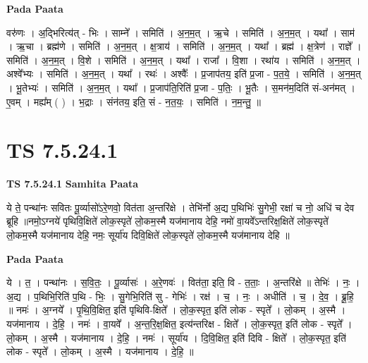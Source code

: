 \documentclass[17pt]{extarticle}
\begin{document}
\textbf{Pada Paata} \newline

वरु॑णः । अ॒द्भिरित्य॑त् - भिः । साम्ने᳚ । समिति॑ । अ॒न॒म॒त् । ऋ॒चे । समिति॑ । अ॒न॒म॒त् । यथा᳚ । साम॑ । ऋ॒चा । ब्रह्म॑णे । समिति॑ । अ॒न॒म॒त् । क्ष॒त्राय॑ । समिति॑ । अ॒न॒म॒त् । यथा᳚ । ब्रह्म॑ । क्ष॒त्रेण॑ । राज्ञे᳚ । समिति॑ । अ॒न॒म॒त् । वि॒शे । समिति॑ । अ॒न॒म॒त् । यथा᳚ । राजा᳚ । वि॒शा । रथा॑य । समिति॑ । अ॒न॒म॒त् । अश्वे᳚भ्यः । समिति॑ । अ॒न॒म॒त् । यथा᳚ । रथः॑ । अश्वैः᳚ । प्र॒जाप॑तय॒ इति॑ प्र॒जा - प॒त॒ये॒ । समिति॑ । अ॒न॒म॒त् । भू॒तेभ्यः॑ । समिति॑ । अ॒न॒म॒त् । यथा᳚ । प्र॒जाप॑ति॒रिति॑ प्र॒जा - प॒तिः॒ । भू॒तैः । स॒मन॑म॒दिति॑ सं-अन॑मत् । ए॒वम् । मह्य᳚म् ( ) । भ॒द्राः । संन॑तय॒ इति॒ सं - न॒त॒यः॒ । समिति॑ । न॒म॒न्तु॒ ॥  \newline




\section*{ TS 7.5.24.1 }

\textbf{TS 7.5.24.1 } \newline
\textbf{Samhita Paata} \newline

ये ते॒ पन्था॑नः सवितः पू॒र्व्यासो॑ऽरे॒णवो॒ वित॑ता अ॒न्तरि॑क्षे । तेभि॑र्नो अ॒द्य प॒थिभिः॑ सु॒गेभी॒ रक्षा॑ च नो॒ अधि॑ च देव ब्रूहि ॥नमो॒ऽग्नये॑ पृथिवि॒क्षिते॑ लोक॒स्पृते॑ लो॒कम॒स्मै यज॑मानाय देहि॒ नमो॑ वा॒यवे᳚ऽन्तरिक्ष॒क्षिते॑ लोक॒स्पृते॑ लो॒कम॒स्मै यज॑मानाय देहि॒ नमः॒ सूर्या॑य दिवि॒क्षिते॑ लोक॒स्पृते॑ लो॒कम॒स्मै यज॑मानाय देहि ॥ \newline

\textbf{Pada Paata} \newline

ये । त॒ । पन्था॑नः । स॒वि॒तः॒ । पू॒र्व्यासः॑ । अ॒रे॒णवः॑ । वित॑ता॒ इति॒ वि - त॒ताः॒ । अ॒न्तरि॑क्षे ॥ तेभिः॑ । नः॒ । अ॒द्य । प॒थिभि॒रिति॑ प॒थि - भिः॒ । सु॒गेभि॒रिति॑ सु - गेभिः॑ । रक्ष॑ । च॒ । नः॒ । अधीति॑ । च॒ । दे॒व॒ । ब्रू॒हि॒ ॥ नमः॑ । अ॒ग्नये᳚ । पृ॒थि॒वि॒क्षित॒ इति॑ पृथिवि-क्षिते᳚ । लो॒क॒स्पृत॒ इति॑ लोक - स्पृते᳚ । लो॒कम् । अ॒स्मै । यज॑मानाय । दे॒हि॒ । नमः॑ । वा॒यवे᳚ । अ॒न्त॒रि॒क्ष॒क्षित॒ इत्य॑न्तरिक्ष - क्षिते᳚ । लो॒क॒स्पृत॒ इति॑ लोक - स्पृते᳚ । लो॒कम् । अ॒स्मै । यज॑मानाय । दे॒हि॒ । नमः॑ । सूर्या॑य । दि॒वि॒क्षित॒ इति॑ दिवि - क्षिते᳚ । लो॒क॒स्पृत॒ इति॑ लोक - स्पृते᳚ । लो॒कम् । अ॒स्मै । यज॑मानाय । दे॒हि॒ ॥  \newline
\end{document}
